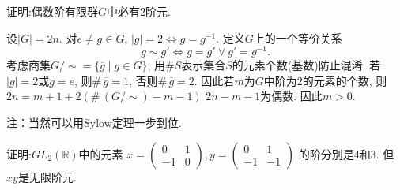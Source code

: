 \begin{problem}
    证明:偶数阶有限群$G$中必有$2$阶元.
\end{problem}

\begin{solution}
    设$|G| = 2n$. 对$e \neq g \in G$, $|g| = 2 \iff g = g^{-1}$.
定义$G$上的一个等价关系
\[
    g \sim g' \iff g = g' \lor g' = g^{-1}.
\]
考虑商集$G/\sim = \{\overline{g} \mid g \in G\}$,
用$\#S$表示集合$S$的元素个数(基数)防止混淆.
若$|g| = 2$或$g = e$, 则$\#\, \overline{g} = 1$, 否则$\#\, \overline{g} = 2$.
因此若$m$为$G$中阶为$2$的元素的个数, 则$2n = m + 1 + 2(\#\, (G/\sim) - m - 1)$
$2n - m - 1$为偶数. 因此$m > 0$.    

注：当然可以用Sylow定理一步到位.
\end{solution}

\begin{problem}
    证明:$GL_2(\mathbb{R})$中的元素
\(
x = \begin{pmatrix}
        0 & 1\\
        -1 & 0
\end{pmatrix}, 
y = \begin{pmatrix}
        0 & 1\\
        -1 & -1
\end{pmatrix}
\)
的阶分别是$4$和$3$. 但$xy$是无限阶元.
\end{problem}

